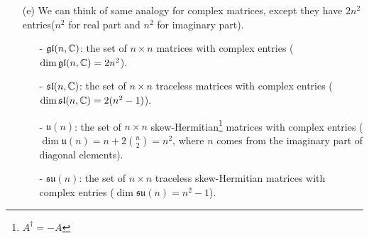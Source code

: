 \documentclass[a4paper, 10pt]{article}
\begin{document}
\begin{example}
\begin{itemize}
        \item[(e)] We can think of same analogy for complex matrices, except they have $2n^{2}$ entries($n^{2}$ for real part and $n^{2}$ for imaginary part).
        \begin{itemize}
            \item[-] $\mathfrak{gl}(n,\mathbb{C})$: the set of $n \times n$ matrices with complex entries ($\dim \mathfrak{gl}(n,\mathbb{C}) = 2n^{2}$).
            \item[-] $\mathfrak{sl}(n,\mathbb{C})$: the set of $n \times n$ traceless matrices with complex entries ($\dim \mathfrak{sl}(n,\mathbb{C}) = 2(n^{2}-1)$).
            \item[-] $\mathfrak{u}(n)$: the set of $n \times n$ skew-Hermitian\footnote{$A^{\dagger} = -A$} matrices with complex entries ($\dim \mathfrak{u}(n) = n + 2\binom{n}{2} = n^{2}$, where $n$ comes from the imaginary part of diagonal elements).
            \item[-] $\mathfrak{su}(n)$: the set of $n \times n$ traceless skew-Hermitian matrices with complex entries ($\dim \mathfrak{su}(n) = n^{2} - 1$).
        \end{itemize}
    \end{itemize}
\end{example}
\end{document}

